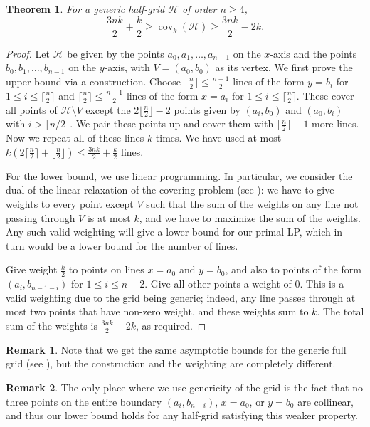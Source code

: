 \documentclass[usenames,dvipsnames, 11pt]{article}
\newtheorem{thm}{Theorem}
\numberwithin{thm}{section}
\theoremstyle{definition}
\theoremstyle{definition}
\newtheorem{rem}{Remark}
\theoremstyle{definition}
\newcommand{\cov}[1]{\operatorname{cov}_{#1}}
\newcommand{\1}{\mathbf{1}}
\def\cH{{\mathcal H}}
\begin{document}
\begin{thm}
    For a generic half-grid $\cH$ of order $n \geq 4$, $$\frac{3nk}{2}+\frac{k}{2} \geq \cov{k}(\cH) \geq \frac{3nk}{2}- 2k.$$
\end{thm}
\begin{proof}
Let $\mathcal{H}$ be given by the points $a_0, a_1, \dots, a_{n -1}$ on the $x$-axis and the points $b_0, b_1, \dots, b_{n - 1}$ on the $y$-axis, with $V = (a_0, b_0)$ as its vertex.
 We first prove the upper bound via a construction.
Choose $\lceil \frac{n}{2} \rceil \leq \frac{n+1}{2}$ lines of the form $y=b_i$ for $1 \leq i \leq \lceil \frac{n}{2} \rceil$ and $\lceil \frac{n}{2} \rceil \leq \frac{n+1}{2}$ lines of the form $x=a_i$ for $1 \leq i \leq \lceil \frac{n}{2} \rceil$. These cover all points of $\cH \setminus V$ except the $2\lfloor \frac{n}{2} \rfloor-2$ points given by $(a_i, b_0)$ and $(a_0, b_i)$ with $i > \lceil n/2 \rceil$. 
We pair these points up and cover them with $\lfloor\frac{n}{2} \rfloor-1$ more lines. Now we repeat all of these lines $k$ times. 
We have used at most $k(2\lceil \frac{n}{2} \rceil+\lfloor \frac{n}{2} \rfloor) \leq \frac{3nk}{2}+\frac{k}{2}$ lines.

For the lower bound, 
we use linear programming. In particular, we consider the dual of the linear relaxation of the covering problem (see \cite[Section 2]{BBDD23}): we have to give weights to every point except $V$ such that the sum of the weights on any line not passing through $V$ is at most $k$, and we have to maximize the sum of the weights. Any such valid weighting will give a lower bound for our primal LP, which in turn would be a lower bound for the number of lines. 

    Give weight $\frac{k}{2}$ to points on lines $x=a_0$ and $y=b_0$, and also to points of the form $(a_i,b_{n-1-i})$ for $1 \leq i \leq n - 2$. Give all other points a weight of $0$. 
    This is a valid weighting due to the grid being generic; indeed, any line passes through at most two points that have non-zero weight, and these weights sum to $k$. 
    The total sum of the weights is $\frac{3nk}{2}-2k$, as required. 
\end{proof}


\begin{rem}
    Note that we get the same asymptotic bounds for the generic full grid (see \cite[Theorem 1.5]{BBDD23}), but the construction and the weighting are completely different. 
\end{rem}

\begin{rem}
    The only place where we use genericity of the grid is the fact that no three points on the entire boundary  $(a_i,b_{n-i})$, $x=a_0$, or $y=b_0$ are collinear, and thus our lower bound holds for any half-grid satisfying this weaker property.
\end{rem}
\end{document}
